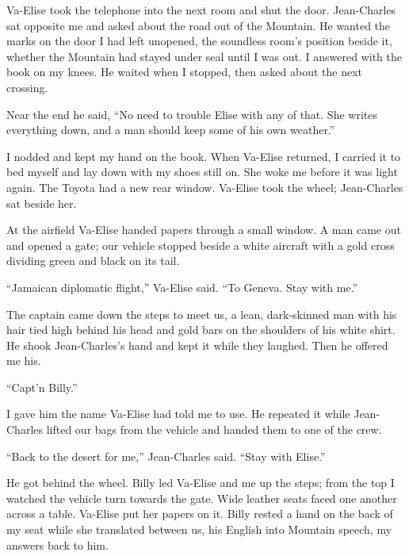 Va-Elise took the telephone into the next room and shut the door. Jean-Charles sat opposite me and asked about the road out of the Mountain. He wanted the marks on the door I had left unopened, the soundless room's position beside it, whether the Mountain had stayed under seal until I was out. I answered with the book on my knees. He waited when I stopped, then asked about the next crossing.\par

Near the end he said, ``No need to trouble Elise with any of that. She writes everything down, and a man should keep some of his own weather.''\par

I nodded and kept my hand on the book. When Va-Elise returned, I carried it to bed myself and lay down with my shoes still on. She woke me before it was light again. The Toyota had a new rear window. Va-Elise took the wheel; Jean-Charles sat beside her.\par

\ornament

At the airfield Va-Elise handed papers through a small window. A man came out and opened a gate; our vehicle stopped beside a white aircraft with a gold cross dividing green and black on its tail.\par

``Jamaican diplomatic flight,'' Va-Elise said. ``To Geneva. Stay with me.''\par

The captain came down the steps to meet us, a lean, dark-skinned man with his hair tied high behind his head and gold bars on the shoulders of his white shirt. He shook Jean-Charles's hand and kept it while they laughed. Then he offered me his.\par

``Capt'n Billy.''\par

I gave him the name Va-Elise had told me to use. He repeated it while Jean-Charles lifted our bags from the vehicle and handed them to one of the crew.\par

``Back to the desert for me,'' Jean-Charles said. ``Stay with Elise.''\par

He got behind the wheel. Billy led Va-Elise and me up the steps; from the top I watched the vehicle turn towards the gate. Wide leather seats faced one another across a table. Va-Elise put her papers on it. Billy rested a hand on the back of my seat while she translated between us, his English into Mountain speech, my answers back to him.\par

